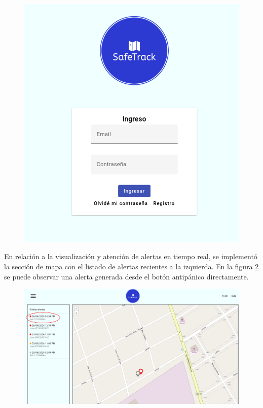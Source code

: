 \begin{figure}[H]
\begin{minipage}{.5\textwidth}
\end{minipage}%
\begin{minipage}{.5\textwidth}
  \centering
  \includegraphics[width=0.9\linewidth]{./Figures/login.png}
  \label{frontend:login}
\end{minipage}
\end{figure}


En relación a la visualización y atención de alertas en tiempo real, se implementó la sección de mapa con el listado de alertas recientes a la izquierda. En la figura \ref{fig:frontend:mapa} se puede observar una alerta generada desde el botón antipánico directamente.

\begin{figure}[H]
	\centering
  	\includegraphics[width=1\linewidth]{./Figures/frontend-alerta.png}
  	\label{fig:frontend:mapa}
\end{figure}	
	
